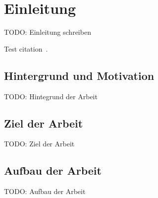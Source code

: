 \section{Einleitung}
\label{sec:introduction}

TODO: Einleitung schreiben

Test citation~\cite{SpringBoot}.

\subsection{Hintergrund und Motivation}
\label{subsec:background}

TODO: Hintegrund der Arbeit

\subsection{Ziel der Arbeit}
\label{subsec:purpose}

TODO: Ziel der Arbeit

\subsection{Aufbau der Arbeit}
\label{subsec:structure}

TODO: Aufbau der Arbeit
